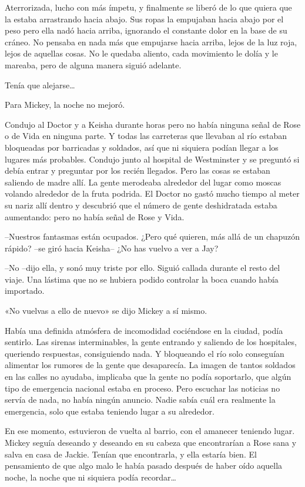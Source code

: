 {Aterrorizada, lucho con más ímpetu, y finalmente se liberó de lo que
 quiera que la estaba arrastrando hacia abajo. Sus ropas la empujaban
 hacia abajo por el peso pero ella nadó hacia arriba, ignorando el
 constante dolor en la base de su cráneo. No pensaba en nada más que
 empujarse hacia arriba, lejos de la luz roja, lejos de aquellas cosas.
 No le quedaba aliento, cada movimiento le dolía y le mareaba, pero de
alguna manera siguió adelante.}

{Tenía que alejarse\ldots{}}

\mbox{}

{Para Mickey, la noche no mejoró.}

{Condujo al Doctor y a Keisha durante horas pero no había ninguna señal
 de Rose o de Vida en ninguna parte. Y todas las carreteras que llevaban
 al río estaban bloqueadas por barricadas y soldados, así que ni siquiera
 podían llegar a los lugares más probables. Condujo junto al hospital de
 Westminster y se preguntó si debía entrar y preguntar por los recién
 llegados. Pero las cosas se estaban saliendo de madre allí. La gente
 merodeaba alrededor del lugar como moscas volando alrededor de la fruta
 podrida. El Doctor no gastó mucho tiempo al meter su nariz allí dentro y
 descubrió que el número de gente deshidratada estaba aumentando: pero no
había señal de Rose y Vida.}

{--Nuestros fantasmas están ocupados. ¿Pero qué quieren, más allá de un
chapuzón rápido? --se giró hacia Keisha-- ¿No has vuelvo a ver a Jay?}

{--No --dijo ella, y sonó muy triste por ello. Siguió callada durante el
 resto del viaje. Una lástima que no se hubiera podido controlar la boca
cuando había importado.}

{«No vuelvas a ello de nuevo» se dijo Mickey a sí mismo.}

{Había una definida atmósfera de incomodidad cociéndose en la ciudad,
 podía sentirlo. Las sirenas interminables, la gente entrando y saliendo
 de los hospitales, queriendo respuestas, consiguiendo nada. Y bloqueando
 el río solo conseguían alimentar los rumores de la gente que
 desaparecía. La imagen de tantos soldados en las calles no ayudaba,
 implicaba que la gente no podía soportarlo, que algún tipo de emergencia
 nacional estaba en proceso. Pero escuchar las noticias no servía de
 nada, no había ningún anuncio. Nadie sabía cuál era realmente la
emergencia, solo que estaba teniendo lugar a su alrededor.}

{En ese momento, estuvieron de vuelta al barrio, con el amanecer
 teniendo lugar. Mickey seguía deseando y deseando en su cabeza que
 encontrarían a Rose sana y salva en casa de Jackie. Tenían que
 encontrarla, y ella estaría bien. El pensamiento de que algo malo le
 había pasado después de haber oído aquella noche, la noche que ni
 siquiera podía recordar\ldots{}}


